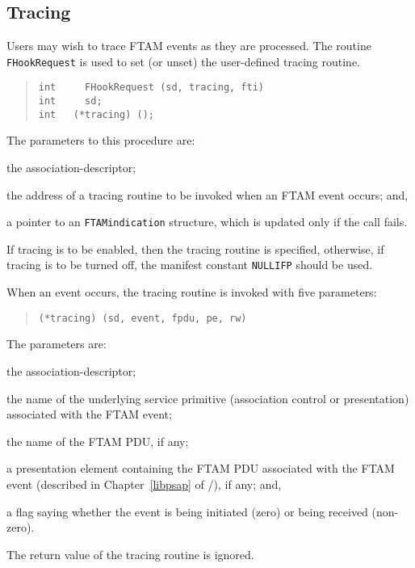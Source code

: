 \subsection	{Tracing}\label{ftam:tracing}
Users may wish to trace FTAM events as they are processed.
The routine \verb"FHookRequest" is used to set (or unset) the user-defined
tracing routine.
\begin{quote}\small\begin{verbatim}
int     FHookRequest (sd, tracing, fti)
int     sd;
int   (*tracing) ();
\end{verbatim}\end{quote}
The parameters to this procedure are:
\begin{describe}
\item[\verb"sd":] the association-descriptor;

\item[\verb"tracing":] the address of a tracing routine to be invoked when an
FTAM event occurs;
and,

\item[\verb"fti":] a pointer to an \verb"FTAMindication" structure, which is updated
only if the call fails.
\end{describe}
If tracing is to be enabled,
then the tracing routine is specified,
otherwise,
if tracing is to be turned off, the manifest constant \verb"NULLIFP" should
be used.

When an event occurs,
the tracing routine is invoked with five parameters:
\begin{quote}\small\begin{verbatim}
(*tracing) (sd, event, fpdu, pe, rw)
\end{verbatim}\end{quote}
The parameters are:
\begin{describe}
\item[\verb"sd":] the association-descriptor;

\item[\verb"event":] the name of the underlying service primitive
(association control or presentation) associated with the FTAM event;

\item[\verb"fpdu":] the name of the FTAM PDU, if any;

\item[\verb"pe":] a presentation element containing the FTAM PDU
associated with the FTAM event
(described in Chapter~\ref{libpsap} of \volone/), if any;
and,

\item[\verb"rw":] a flag saying whether the event is being initiated (zero)
or being received (non-zero).
\end{describe}
The return value of the tracing routine is ignored.

